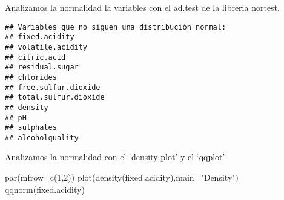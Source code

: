 \documentclass[
]{article}
\newenvironment{Shaded}{\begin{snugshade}}{\end{snugshade}}
\newcommand{\AttributeTok}[1]{\textcolor[rgb]{0.77,0.63,0.00}{#1}}
\newcommand{\CommentTok}[1]{\textcolor[rgb]{0.56,0.35,0.01}{\textit{#1}}}
\newcommand{\ControlFlowTok}[1]{\textcolor[rgb]{0.13,0.29,0.53}{\textbf{#1}}}
\newcommand{\DecValTok}[1]{\textcolor[rgb]{0.00,0.00,0.81}{#1}}
\newcommand{\FloatTok}[1]{\textcolor[rgb]{0.00,0.00,0.81}{#1}}
\newcommand{\FunctionTok}[1]{\textcolor[rgb]{0.00,0.00,0.00}{#1}}
\newcommand{\NormalTok}[1]{#1}
\newcommand{\OtherTok}[1]{\textcolor[rgb]{0.56,0.35,0.01}{#1}}
\newcommand{\SpecialCharTok}[1]{\textcolor[rgb]{0.00,0.00,0.00}{#1}}
\newcommand{\StringTok}[1]{\textcolor[rgb]{0.31,0.60,0.02}{#1}}
\begin{document}
Analizamos la normalidad la variables con el ad.test de la libreria
nortest.

\begin{Shaded}
\end{Shaded}

\begin{verbatim}
## Variables que no siguen una distribución normal:
## fixed.acidity
## volatile.acidity
## citric.acid
## residual.sugar
## chlorides
## free.sulfur.dioxide
## total.sulfur.dioxide
## density
## pH
## sulphates
## alcoholquality
\end{verbatim}

Analizamos la normalidad con el `density plot' y el `qqplot'

\begin{Shaded}
\begin{Highlighting}[]
\FunctionTok{par}\NormalTok{(}\AttributeTok{mfrow=}\FunctionTok{c}\NormalTok{(}\DecValTok{1}\NormalTok{,}\DecValTok{2}\NormalTok{))}
\FunctionTok{plot}\NormalTok{(}\FunctionTok{density}\NormalTok{(fixed.acidity),}\AttributeTok{main=}\StringTok{"Density"}\NormalTok{)}
\FunctionTok{qqnorm}\NormalTok{(fixed.acidity)}
\end{Highlighting}
\end{Shaded}
\end{document}
